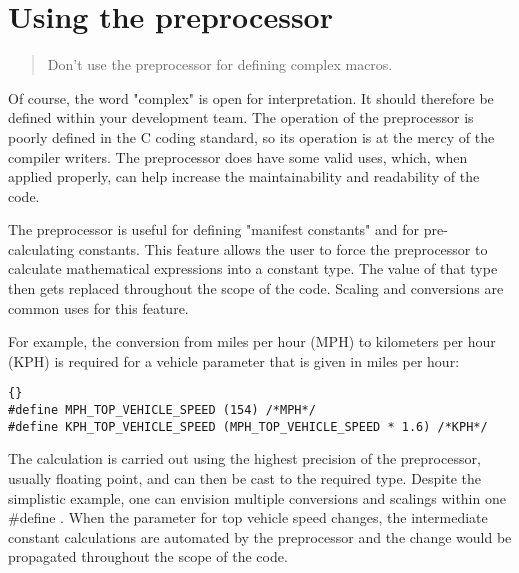\documentclass{report}
\begin{document}
\section{Using the preprocessor}
\begin{quote}
Don't use the preprocessor for defining complex macros.
\end{quote}
Of course, the word "complex" is open for interpretation. It should therefore be defined within your development team. The operation of the preprocessor is poorly defined in the C coding standard, so its operation is at the mercy of the compiler writers. The preprocessor does have some valid uses, which, when applied properly, can help increase the maintainability and readability of the code. 

The preprocessor is useful for defining "manifest constants" and for pre-calculating constants. This feature allows the user to force the preprocessor to calculate mathematical expressions into a constant type. The value of that type then gets replaced throughout the scope of the code. Scaling and conversions are common uses for this feature.

For example, the conversion from miles per hour (MPH) to kilometers per hour (KPH) is required for a vehicle parameter that is given in miles per hour: 
\begin{lstlisting}{}
#define MPH_TOP_VEHICLE_SPEED (154) /*MPH*/
#define KPH_TOP_VEHICLE_SPEED (MPH_TOP_VEHICLE_SPEED * 1.6) /*KPH*/
\end{lstlisting}
The calculation is carried out using the highest precision of the preprocessor, usually floating point, and can then be cast to the required type. Despite the simplistic example, one can envision multiple conversions and scalings within one \#define . When the parameter for top vehicle speed changes, the intermediate constant calculations are automated by the preprocessor and the change would be propagated throughout the scope of the code.
\end{document}
